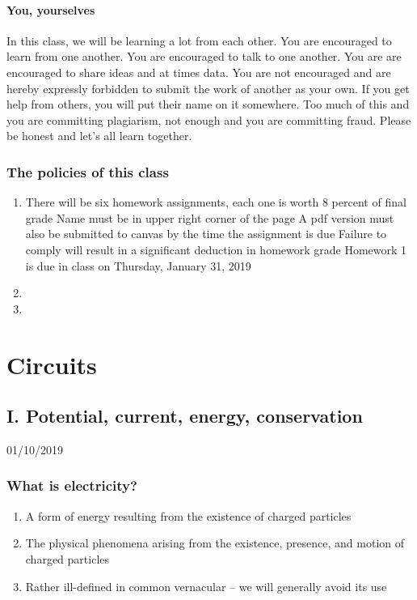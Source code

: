 \documentclass[11pt]{book}
\begin{document}
\subsection{You, yourselves}
In this class, we will be learning a lot from each other. You are encouraged to learn from one another. You are encouraged to talk to one another. You are are encouraged to share ideas and at times data. You are not encouraged and are hereby expressly forbidden to submit the work of another as your own. If you get help from others, you will put their name on it somewhere. Too much of this and you are committing plagiarism, not enough and you are committing fraud. Please be honest and let's all learn together.



\newpage
\section{The policies of this class}
\begin{enumerate}
\item There will be six homework assignments, each one is worth 8 percent of final grade
\subitem Name must be in upper right corner of the page
\subitem A pdf version must also be submitted to canvas by the time the assignment is due
\subitem Failure to comply will result in a significant deduction in homework grade
\subitem Homework 1 is due in class on Thursday, January 31, 2019
\item
\item
\end{enumerate}


\mainmatter
\setcounter{page}{1}



\part{Circuits}



\chapter{I. Potential, current, energy, conservation}
01/10/2019
\minitoc



\section{What is electricity?}

\begin{enumerate}
	\item A form of energy resulting from the existence of charged particles 
	\item The physical phenomena arising from the existence, presence, and motion of charged particles
	\item Rather ill-defined in common vernacular – we will generally avoid its use
\end{enumerate}
\end{document}

